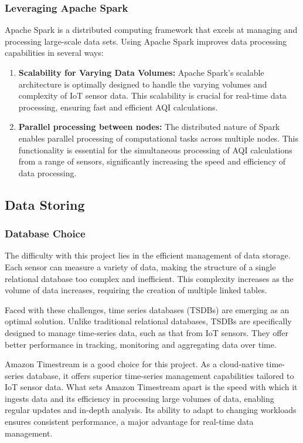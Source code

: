 \documentclass[12pt,oneside]{book} %
\begin{document}
\subsubsection{Leveraging Apache Spark}
Apache Spark is a distributed computing framework that excels at managing and
processing large-scale data sets. Using Apache Spark improves data processing
capabilities in several ways:

\begin{enumerate}
    \item \textbf{Scalability for Varying Data Volumes:} Apache Spark's scalable architecture is optimally designed to handle the varying volumes and complexity of IoT sensor data. This scalability is crucial for real-time data processing, ensuring fast and efficient AQI calculations.

    \item \textbf{Parallel processing between nodes:} The distributed nature of Spark enables parallel processing of computational tasks across multiple nodes. This functionality is essential for the simultaneous processing of AQI calculations from a range of sensors, significantly increasing the speed and efficiency of data processing.
\end{enumerate}

\subsection{Data Storing}

\subsubsection{Database Choice}
The difficulty with this project lies in the efficient management of data
storage. Each sensor can measure a variety of data, making the structure of a
single relational database too complex and inefficient. This complexity
increases as the volume of data increases, requiring the creation of multiple
linked tables.

Faced with these challenges, time series databases (TSDBs) are emerging as an
optimal solution. Unlike traditional relational databases, TSDBs are
specifically designed to manage time-series data, such as that from IoT
sensors. They offer better performance in tracking, monitoring and aggregating
data over time.

Amazon Timestream is a good choice for this project. As a cloud-native
time-series database, it offers superior time-series management capabilities
tailored to IoT sensor data. What sets Amazon Timestream apart is the speed
with which it ingests data and its efficiency in processing large volumes of
data, enabling regular updates and in-depth analysis. Its ability to adapt to
changing workloads ensures consistent performance, a major advantage for
real-time data management.
\end{document}
